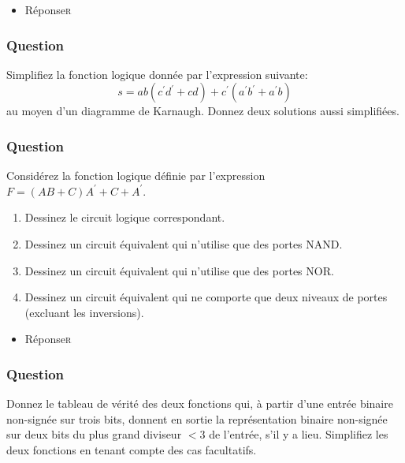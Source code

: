 \documentclass[11pt]{article}
\begin{document}
\begin{itemize}
\item Réponse\hfill{}\textsc{r}
\label{sec:org959ace5}
\end{itemize}

\subsubsection*{Question}
\label{sec:org2ae878d}
Simplifiez la fonction logique donnée par l'expression suivante:
  $$
    s = a b ( c^{\prime} d^{\prime} + c d) + c^{\prime}(a^{\prime}
      b^{\prime} + a^{\prime} b)
    $$
   au moyen d'un diagramme de Karnaugh. Donnez deux solutions aussi simplifiées.

\subsubsection*{Question}
\label{sec:org4d978fe}
Considérez la fonction logique définie par l'expression \(F = (AB + C)
      A^{\prime} + C + A^{\prime}\).

\begin{enumerate}
\item Dessinez le circuit logique correspondant.

\item Dessinez un circuit équivalent qui n'utilise que des portes
NAND.

\item Dessinez un circuit équivalent qui n'utilise que des portes
NOR.

\item Dessinez un circuit équivalent qui ne comporte que deux niveaux de
portes (excluant les inversions).
\end{enumerate}

\begin{itemize}
\item Réponse\hfill{}\textsc{r}
\label{sec:orgf7f91c8}
\end{itemize}

\subsubsection*{Question}
\label{sec:org7fa6146}
Donnez le tableau  de vérité des deux fonctions qui, à partir d'une
  entrée binaire non-signée sur trois bits, donnent en sortie la
  représentation binaire non-signée sur deux bits du plus grand diviseur
  \(< 3\) de l'entrée, s'il y a lieu. Simplifiez les deux fonctions en
  tenant compte des cas facultatifs.
\end{document}
